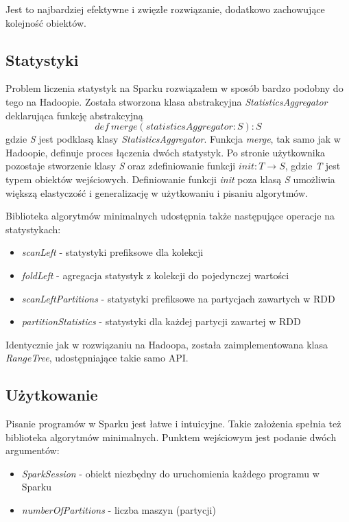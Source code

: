 \documentclass[licencjacka]{pracamgr}
\begin{document}
Jest to najbardziej efektywne i zwięzłe rozwiązanie, dodatkowo zachowujące kolejność obiektów. 

\subsection{Statystyki}

Problem liczenia statystyk na Sparku rozwiązałem w sposób bardzo podobny do tego na Hadoopie. Została stworzona klasa abstrakcyjna \textit{StatisticsAggregator} deklarująca funkcję abstrakcyjną
$$def \ merge(statisticsAggregator: S): S $$ gdzie \textit{S} jest podklasą klasy \textit{StatisticsAggregator}. Funkcja \textit{merge}, tak samo jak w Hadoopie, definuje proces łączenia dwóch statystyk. Po stronie użytkownika pozostaje stworzenie klasy \textit{S} oraz zdefiniowanie funkcji $init: T \rightarrow S$, gdzie \textit{T} jest typem obiektów wejściowych. Definiowanie funkcji \textit{init} poza klasą \textit{S} umożliwia większą elastyczość i generalizację w użytkowaniu i pisaniu algorytmów.

Biblioteka algorytmów minimalnych udostępnia także następujące operacje na statystykach:
\begin{itemize}
    \item \textit{scanLeft} - statystyki prefiksowe dla kolekcji
    \item \textit{foldLeft} - agregacja statystyk z kolekcji do pojedynczej wartości
    \item \textit{scanLeftPartitions} - statystyki prefiksowe na partycjach zawartych w RDD
    \item \textit{partitionStatistics} - statystyki dla każdej partycji zawartej w RDD
\end{itemize}

Identycznie jak w rozwiązaniu na Hadoopa, została zaimplementowana klasa \textit{RangeTree}, udostępniające takie samo API.

\subsection{Użytkowanie}

Pisanie programów w Sparku jest łatwe i intuicyjne. Takie założenia spełnia też biblioteka algorytmów minimalnych. Punktem wejściowym jest podanie dwóch argumentów:
\begin{itemize}
    \item \textit{SparkSession} - obiekt niezbędny do uruchomienia każdego programu w Sparku
    \item \textit{numberOfPartitions} - liczba maszyn (partycji)
\end{itemize}
\end{document}
